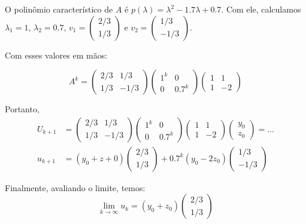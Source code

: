 \documentclass[12pt]{article}
\begin{document}
	O polinômio característico de $A$ é $p(\lambda)=\lambda^2-1.7\lambda+0.7$. Com ele, calculamos $\lambda_1=1$, $\lambda_2=0.7$, $v_1=\begin{pmatrix}
		2/3 \\
		1/3
	\end{pmatrix}$ e $v_2=\begin{pmatrix}
		1/3 \\
		-1/3
	\end{pmatrix}$.
	
	Com esses valores em mãos:
	
	\begin{equation*}
		A^k=\begin{pmatrix}
			2/3 & 1/3 \\
			1/3 & -1/3
		\end{pmatrix}
		\begin{pmatrix}
			1^k & 0 \\
			0 & 0.7^k
		\end{pmatrix}
		\begin{pmatrix}
			1 & 1 \\
			1 & -2
		\end{pmatrix}	
	\end{equation*}
	
	Portanto,
	\begin{align*}
		U_{k+1}&=\begin{pmatrix}
			2/3 & 1/3 \\
			1/3 & -1/3
		\end{pmatrix}
		\begin{pmatrix}
			1^k & 0 \\
			0 & 0.7^k
		\end{pmatrix}
		\begin{pmatrix}
			1 & 1 \\
			1 & -2
		\end{pmatrix}
		\begin{pmatrix}
			y_0 \\
			z_0
		\end{pmatrix}=...\\
		u_{k+1}&=(y_0+z+0)\begin{pmatrix}
			2/3 \\
			1/3
		\end{pmatrix}+0.7^k(y_0-2z_0)\begin{pmatrix}
			1/3 \\
			-1/3
		\end{pmatrix}
	\end{align*}
	
	Finalmente, avaliando o limite, temos:
	\begin{equation*}
		\lim_{k\to\infty}u_{k}=(y_0+z_0)\begin{pmatrix}
			2/3 \\
			1/3
		\end{pmatrix}
	\end{equation*}
	
\end{document}
